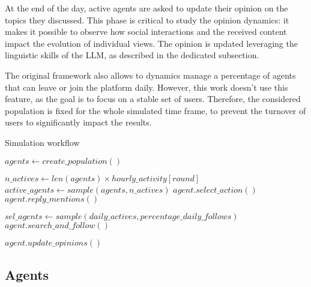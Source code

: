 At the end of the day, active agents are asked to update their opinion on the topics they discussed.
This phase is critical to study the opinion dynamics: it makes it possible to observe how social interactions and the received content impact the evolution of individual views.
The opinion is updated leveraging the linguistic skills of the LLM, as described in the dedicated subsection.

\medskip
The original framework also allows to dynamics manage a percentage of agents that can leave or join the platform daily. 
However, this work doesn't use this feature, as the goal is to focus on a stable set of users.
Therefore, the considered population is fixed for the whole simulated time frame, to prevent the turnover of users to significantly impact the results.

\begin{algorithm}
\caption{Simulation workflow}
\label{alg:workflow}
\begin{algorithmic}[1]
\STATE $agents \gets create\_population()$

        \STATE $n\_actives \gets len(agents) \times hourly\_activity[round]$
        \STATE $active\_agents \gets sample(agents, n\_actives)$ 
            \STATE $agent.select\_action()$
            \STATE $agent.reply\_mentions()$
        \ENDFOR
    \ENDFOR

    \STATE $sel\_agents \gets sample(daily\_actives, percentage\_daily\_follows)$
        \STATE $agent.search\_and\_follow()$
    \ENDFOR

        \STATE $agent.update\_opinions()$
    \ENDFOR

\ENDFOR
\end{algorithmic}
\end{algorithm}




\subsection{Agents}

